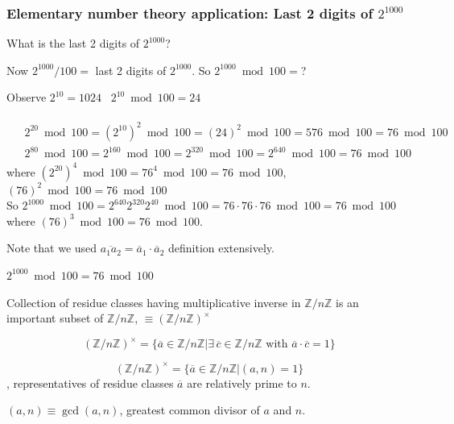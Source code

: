 \subsubsection{Elementary number theory application: Last 2 digits of $2^{1000}$}

What is the last 2 digits of $2^{1000}$?

Now $2^{1000} / 100 =$ last 2 digits of $2^{1000}$. So $2^{1000} \bmod{100} = $?

Observe $2^{10} = 1024$ \qquad \, $2^{10} \bmod{100} = 24$

\[
\begin{gathered}
\begin{aligned}
& 2^{20} \bmod{100} = (2^{10})^2 \bmod{100} = (24)^2 \bmod{100} = 576 \bmod{100} = 76 \bmod{100} \\
& 2^{80} \bmod{100} = 2^{160} \bmod{100} = 2^{320} \bmod{100} = 2^{640} \bmod{100} = 76 \bmod{100}
\end{aligned}
\end{gathered}
\]
where $(2^{20})^4 \bmod{100} = 76^4 \bmod{100} = 76 \bmod{100}$, \\
$(76)^{2} \bmod{100} = 76 \bmod{100}$ \\

So $2^{1000} \bmod{100} = 2^{640} 2^{320} 2^{40} \bmod{100} = 76 \cdot 76 \cdot 76 \bmod{100} = 76 \bmod{100}$ where $(76)^3 \bmod{100} = 76 \bmod{100}$. 

Note that we used $\overline{a_1a_2} = \overline{a}_1 \cdot \overline{a}_2$ definition extensively.

$2^{1000} \bmod{100} = 76 \bmod{100}$

Collection of residue classes having multiplicative inverse in $\mathbb{Z} / n\mathbb{Z}$ is an important subset of $\mathbb{Z} / n\mathbb{Z}$, $\equiv (\mathbb{Z} / n\mathbb{Z})^{\times}$

\begin{definition}
\begin{equation}
(\mathbb{Z} / n\mathbb{Z})^{\times} = \lbrace \overline{a} \in \mathbb{Z} / n \mathbb{Z} | \exists \, \overline{c} \in \mathbb{Z} / n \mathbb{Z} \text{ with } \overline{a} \cdot \overline{c} = 1 \rbrace 
\end{equation}
\end{definition}

\begin{proposition}
\[
(\mathbb{Z} / n\mathbb{Z})^{\times} = \lbrace \overline{a} \in \mathbb{Z} / n \mathbb{Z} | (a,n) = 1 \rbrace
\], representatives of residue classes $\overline{a}$ are relatively prime to $n$.

$(a,n) \equiv \gcd{(a,n)}$, greatest common divisor of $a$ and $n$. 
\end{proposition}

